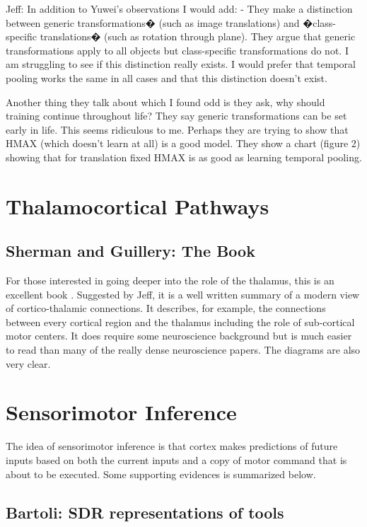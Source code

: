 \documentclass{article} %
\begin{document}
Jeff:  In addition to Yuwei's observations I would add:  - They make a
distinction between generic transformations� (such as image translations) and
�class-specific translations� (such as rotation through plane).  They argue that
generic transformations apply to all objects but class-specific transformations
do not.  I am struggling to see if this distinction really exists.  I would
prefer that temporal pooling works the same in all cases and that this
distinction doesn't exist.


Another thing they talk about which I found odd is they ask, why should
training continue throughout life?  They say generic transformations can be set
early in life.  This seems ridiculous to me.  Perhaps they are trying to show
that HMAX (which doesn't learn at all) is a good model.  They show a chart
(figure 2) showing that for translation fixed HMAX is as good as learning
temporal pooling.


\section{Thalamocortical Pathways}

\subsection{Sherman and Guillery: The Book}

For those interested in going deeper into the role of the thalamus, this is an
excellent book \cite{Sherman}. Suggested by Jeff, it is a well written summary
of a modern view of cortico-thalamic connections. It describes, for example, the
connections between every cortical region and the thalamus including the role of
sub-cortical motor centers. It does require some neuroscience background but is
much easier to read than many of the really dense neuroscience papers. The
diagrams are also very clear.

\section{Sensorimotor Inference}

The idea of sensorimotor inference is that cortex makes predictions of future
inputs based on both the current inputs and a copy of motor command that is
about to be executed.  Some supporting evidences is summarized below.

\subsection{Bartoli: SDR representations of tools}
\end{document}
